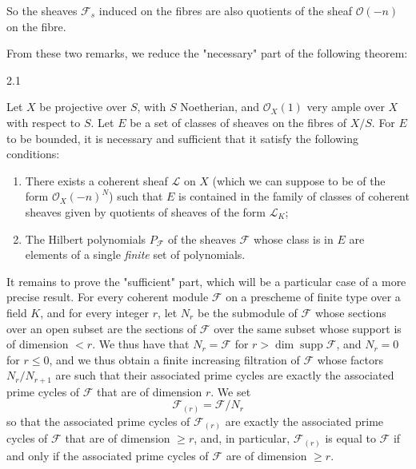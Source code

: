   So the sheaves \(\mathscr {F}_s\) induced on the fibres are also quotients of the sheaf \(\mathcal {O}(-n)\) on the fibre.\par{}From these two remarks, we reduce the "necessary" part of the following theorem:\begin{theorem}{2.1}\label{fga3.iv-2-theorem-2.1}\skipsinglepar\par{}Let \(X\) be projective over \(S\), with \(S\) Noetherian, and \(\mathcal {O}_X(1)\) very ample over \(X\) with respect to \(S\).
    Let \(E\) be a set of classes of sheaves on the fibres of \(X/S\).
    For \(E\) to be bounded, it is necessary and sufficient that it satisfy the following conditions:

    
 \begin{enumerate}
      
 \item[a.]
        There exists a coherent sheaf \(\mathscr {L}\) on \(X\) (which we can suppose to be of the form \(\mathcal {O}_X(-n)^N\)) such that \(E\) is contained in the family of classes of coherent sheaves given by quotients of sheaves of the form \(\mathscr {L}_K\);
      

      
 \item[b.]
        The Hilbert polynomials \(P_\mathscr {F}\) of the sheaves \(\mathscr {F}\) whose class is in \(E\) are elements of a single \emph{finite} set of polynomials.
      

    \end{enumerate}\end{theorem}\par{}It remains to prove the "sufficient" part, which will be a particular case of a more precise result.
  For every coherent module \(\mathscr {F}\) on a prescheme of finite type over a field \(K\), and for every integer \(r\), let \(N_r\) be the submodule of \(\mathscr {F}\) whose sections over an open subset are the sections of \(\mathscr {F}\) over the same subset whose support is of dimension \(<r\).
  We thus have that \(N_r=\mathscr {F}\) for \(r>\dim \operatorname {supp}\mathscr {F}\), and \(N_r=0\) for \(r\leqslant 0\), and we thus obtain a finite increasing filtration of \(\mathscr {F}\) whose factors \(N_r/N_{r+1}\) are such that their associated prime cycles are exactly the associated prime cycles of \(\mathscr {F}\) that are of dimension \(r\).
  We set
  \[     \mathscr {F}_{(r)}     = \mathscr {F}/N_r   \]
  so that the associated prime cycles of \(\mathscr {F}_{(r)}\) are exactly the associated prime cycles of \(\mathscr {F}\) that are of dimension \(\geqslant  r\), and, in particular, \(\mathscr {F}_{(r)}\) is equal to \(\mathscr {F}\) if and only if the associated prime cycles of \(\mathscr {F}\) are of dimension \(\geqslant  r\).
